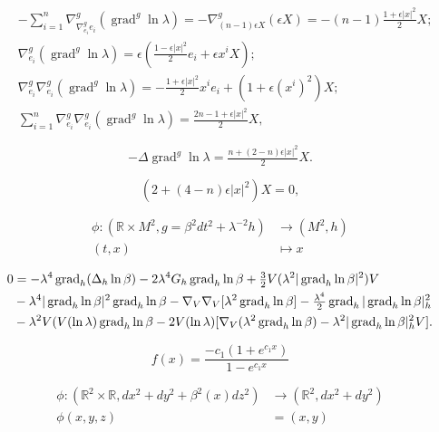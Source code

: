 \documentclass[12pt]{article}
\begin{document}
\begin{align*}
& - \sum_{i=1}^{n} \nabla^{g}_{\nabla^{g}_{e_{i}}e_{i}} (\operatorname{grad}^g \ln\lambda) = -
\nabla^{g}_{(n-1) \epsilon X} (\epsilon X)
= - (n-1) \tfrac{1+\epsilon |x|^2}{2} X ;\\
&\nabla^{g}_{e_{i}} (\operatorname{grad}^g \ln\lambda)  = \epsilon (\tfrac{1-\epsilon |x|^2}{2} e_i + \epsilon x^i X) ;\\
&\nabla^{g}_{e_{i}}\nabla^{g}_{e_{i}} (\operatorname{grad}^g \ln\lambda) = - \tfrac{1 + \epsilon |x|^2}{2} x^i e_i + (1+ \epsilon (x^i)^2)X ;\\
&\sum_{i=1}^{n} \nabla^{g}_{e_{i}}\nabla^{g}_{e_{i}} (\operatorname{grad}^g \ln\lambda) = \tfrac{2n-1
+ \epsilon |x|^2}{2} X,
\end{align*}

$$- \Delta \operatorname{grad}^g \ln\lambda = \tfrac{n + (2-n)\epsilon |x|^2}{2} X.$$

$$ (2 + (4-n)\epsilon|x|^2) X =0,$$

\begin{align*}
\phi  : ( {{\mathbb R}} \times M^2 , g= \beta^2 dt^2 + \lambda^{-2} h) &\to (M^2 ,h) \\
(t,x) &\mapsto x
\end{align*}

\begin{align}\label{2D}
0 &= -\lambda^4 \operatorname{grad}_{h} (\Delta_{h} \ln\beta)  - 2\lambda^4 G_{h} \operatorname{grad}_{h} \ln\beta +
\tfrac{3}{2} V(\lambda^2|\operatorname{grad}_{h}\ln \beta|^2) V\\\notag &- \lambda^4|\operatorname{grad}_{h}\ln
\beta|^2 \operatorname{grad}_{h}\ln \beta - \nabla_{V}\nabla_{V} [\lambda^2 \operatorname{grad}_{h}\ln \beta] -
\tfrac{\lambda^{4}}{2} \operatorname{grad}_{h} |\operatorname{grad}_{h} \ln\beta|_{h}^{2} \\\notag & - \lambda^2
V(V(\ln\lambda)\operatorname{grad}_h \ln\beta - 2V(\ln\lambda)[\nabla_{V} (\lambda^2 \operatorname{grad}_{h}\ln \beta)
- \lambda^2 |\operatorname{grad}_h \ln\beta |_{h}^2 V].
\end{align}

$$f(x) = \frac{-c_1 (1+e^{c_1 x})}{1-e^{c_1 x}}$$

\begin{align*}
\phi : ({{\mathbb R}}^2 \times {{\mathbb R}} , dx^2 + dy^2 + \beta^2(x) dz^2) &\to ({{\mathbb R}}^2 , dx^2 + dy^2)\\
\phi(x,y,z) &= (x,y)
\end{align*}
\end{document}
